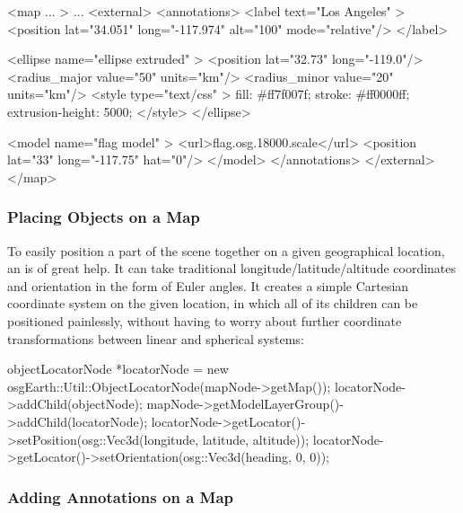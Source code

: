 \begin{filelisting}
<map ... >
    ...
    <external>
        <annotations>
            <label text="Los Angeles" >
                <position lat="34.051" long="-117.974" alt="100" mode="relative"/>
            </label>

            <ellipse name="ellipse extruded" >
                <position lat="32.73" long="-119.0"/>
                <radius_major value="50" units="km"/>
                <radius_minor value="20" units="km"/>
                <style type="text/css" >
                    fill:             #ff7f007f;
                    stroke:           #ff0000ff;
                    extrusion-height: 5000;
                </style>
            </ellipse>

            <model name="flag model" >
                <url>flag.osg.18000.scale</url>
                <position lat="33" long="-117.75" hat="0"/>
            </model>
        </annotations>
    </external>
</map>
\end{filelisting}

\subsubsection{Placing Objects on a Map}
\label{sec:graphics:osgearth-placing-objects}

To easily position a part of the scene together on a given geographical location,
an  is of great help. It can take
traditional longitude/latitude/altitude coordinates and orientation in the form
of Euler angles. It creates a simple Cartesian coordinate system on the given
location, in which all of its children can be positioned painlessly, without
having to worry about further coordinate transformations between linear and
spherical systems:

\begin{cpp}
objectLocatorNode *locatorNode =
    new osgEarth::Util::ObjectLocatorNode(mapNode->getMap());
locatorNode->addChild(objectNode);
mapNode->getModelLayerGroup()->addChild(locatorNode);
locatorNode->getLocator()->setPosition(osg::Vec3d(longitude, latitude, altitude));
locatorNode->getLocator()->setOrientation(osg::Vec3d(heading, 0, 0));
\end{cpp}

\subsubsection{Adding Annotations on a Map}
\label{sec:graphics:osgearth-adding-annotations}

